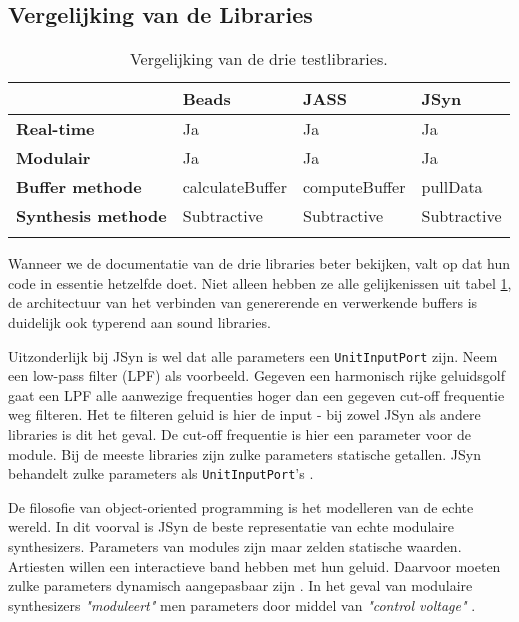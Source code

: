 \subsection*{Vergelijking van de Libraries}

\begin{longtable}[c]{l|lll}
         & \textbf{Beads} & \textbf{JASS} & \textbf{JSyn} \\ \hline
        \textbf{Real-time} & Ja & Ja & Ja \\
        \textbf{Modulair} & Ja & Ja & Ja \\
        \textbf{Buffer methode} & calculateBuffer & computeBuffer & pullData \\
        \textbf{Synthesis methode} & Subtractive & Subtractive & Subtractive \\
    \caption{Vergelijking van de drie testlibraries.}
    \label{tab:vergelijking}
\end{longtable}

Wanneer we de documentatie van de drie libraries beter bekijken, valt op dat hun code in essentie hetzelfde doet. Niet alleen hebben ze alle gelijkenissen uit tabel \ref{tab:vergelijking}, de architectuur van het verbinden van genererende en verwerkende buffers is duidelijk ook typerend aan sound libraries.

Uitzonderlijk bij JSyn is wel dat alle parameters een \verb+UnitInputPort+ zijn. Neem een low-pass filter (LPF) als voorbeeld. Gegeven een harmonisch rijke geluidsgolf gaat een LPF alle aanwezige frequenties hoger dan een gegeven cut-off frequentie weg filteren. Het te filteren geluid is hier de input - bij zowel JSyn als andere libraries is dit het geval. De cut-off frequentie is hier een parameter voor de module.\newline
Bij de meeste libraries zijn zulke parameters statische getallen. JSyn behandelt zulke parameters als \verb+UnitInputPort+'s \autocite{jsyndocs}.

De filosofie van object-oriented programming is het modelleren van de echte wereld. In dit voorval is JSyn de beste representatie van echte modulaire synthesizers. Parameters van modules zijn maar zelden statische waarden. Artiesten willen een interactieve band hebben met hun geluid. Daarvoor moeten zulke parameters dynamisch aangepasbaar zijn \autocite{vagabundos}. In het geval van modulaire synthesizers \textit{"moduleert"} men parameters door middel van \textit{"control voltage"} \autocite{modular}.

\iffalse

